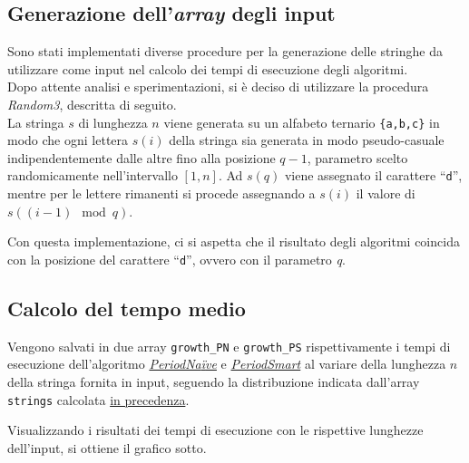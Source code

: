 \documentclass[11pt,a4paper,italian]{article}
\begin{document}
\subsection{Generazione dell'\textit{array} degli input}
Sono stati implementati diverse procedure per la generazione delle stringhe da utilizzare come input nel calcolo dei tempi di esecuzione degli algoritmi.\\
Dopo attente analisi e sperimentazioni, si è deciso di utilizzare la procedura \textit{Random3}, descritta di seguito.\\
La stringa $s$ di lunghezza $n$ viene generata su un alfabeto ternario \texttt{\{a,b,c\}} in modo che ogni lettera $s(i)$ della stringa sia generata in modo pseudo-casuale indipendentemente dalle altre fino alla posizione $q-1$, parametro scelto randomicamente nell'intervallo $[1,n]$. Ad $s(q)$ viene assegnato il carattere ``\texttt{d}'', mentre per le lettere rimanenti si procede assegnando a $s(i)$ il valore di $s( (i-1) \mod q )$.

Con questa implementazione, ci si aspetta che il risultato degli algoritmi coincida con la posizione del carattere ``\texttt{d}'', ovvero con il parametro \textit{q}.

\subsection{Calcolo del tempo medio}
Vengono salvati in due array \texttt{growth\_PN} e \texttt{growth\_PS} rispettivamente i tempi di esecuzione dell'algoritmo \hyperlink{section.2}{\textit{PeriodNa{\"i}ve}} e \hyperlink{section.3}{\textit{PeriodSmart}} al variare della lunghezza $n$ della stringa fornita in input, seguendo la distribuzione indicata dall'array \texttt{strings} calcolata \hyperlink{subsection.4.3}{in precedenza}.

Visualizzando i risultati dei tempi di esecuzione con le rispettive lunghezze dell'input, si ottiene il grafico sotto.
\end{document}
